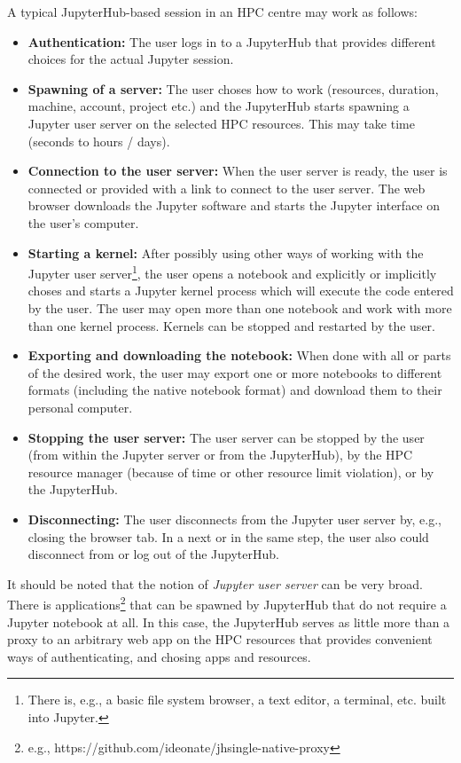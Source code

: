 A typical JupyterHub-based session in an HPC centre may work as follows:
\begin{itemize}
  \item \textbf{Authentication:} The user logs in to a JupyterHub that provides different choices for the actual Jupyter session.
  \item \textbf{Spawning of a server:} The user choses how to work (resources, duration, machine, account, project etc.) and the JupyterHub starts spawning a Jupyter user server on the selected HPC resources.
  This may take time (seconds to hours / days).
  \item \textbf{Connection to the user server:} When the user server is ready, the user is connected or provided with a link to connect to the user server.
  The web browser downloads the Jupyter software and starts the Jupyter interface on the user's computer.
  \item \textbf{Starting a kernel:} After possibly using other ways of working with the Jupyter user server\footnote{There is, e.g., a basic file system browser, a text editor, a terminal, etc. built into Jupyter.}, the user opens a notebook and explicitly or implicitly choses and starts a Jupyter kernel process which will execute the code entered by the user.
  The user may open more than one notebook and work with more than one kernel process.
  Kernels can be stopped and restarted by the user.
  \item \textbf{Exporting and downloading the notebook:} When done with all or parts of the desired work, the user may export one or more notebooks to different formats (including the native notebook format) and download them to their personal computer.
  \item \textbf{Stopping the user server:} The user server can be stopped by the user (from within the Jupyter server or from the JupyterHub), by the HPC resource manager (because of time or other resource limit violation), or by the JupyterHub.
  \item \textbf{Disconnecting:} The user disconnects from the Jupyter user server by, e.g., closing the browser tab.
  In a next or in the same step, the user also could disconnect from or log out of the JupyterHub.
\end{itemize}

It should be noted that the notion of \emph{Jupyter user server} can be very broad.
There is applications\footnote{e.g., https://github.com/ideonate/jhsingle-native-proxy} that can be spawned by JupyterHub that do not require a Jupyter notebook at all.
In this case, the JupyterHub serves as little more than a proxy to an arbitrary web app on the HPC resources that provides convenient ways of authenticating, and chosing apps and resources.

